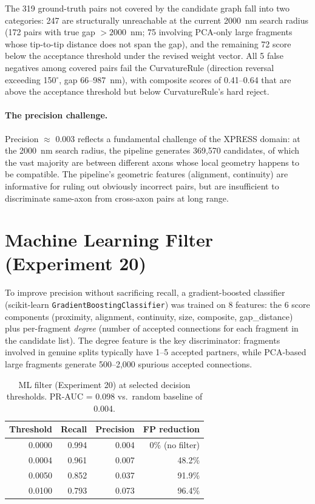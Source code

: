 The 319 ground-truth pairs not covered by the candidate graph fall into two categories:
247 are structurally unreachable at the current 2000~nm search radius (172 pairs
with true gap $> 2000$~nm; 75 involving PCA-only large fragments whose tip-to-tip
distance does not span the gap), and the remaining 72 score below the acceptance
threshold under the revised weight vector. All 5 false negatives among covered
pairs fail the CurvatureRule (direction reversal exceeding 150$^\circ$, gap
66--987~nm), with composite scores of 0.41--0.64 that are above the acceptance
threshold but below CurvatureRule's hard reject.

\paragraph{The precision challenge.}
Precision $\approx$ 0.003 reflects a fundamental challenge of the XPRESS
domain: at the 2000~nm search radius, the pipeline generates 369{,}570
candidates, of which the vast majority are between different axons whose
local geometry
happens to be compatible. The pipeline's geometric features (alignment, continuity)
are informative for ruling out obviously incorrect pairs, but are insufficient
to discriminate same-axon from cross-axon pairs at long range.

\section{Machine Learning Filter (Experiment 20)}

To improve precision without sacrificing recall, a gradient-boosted classifier
(scikit-learn \texttt{GradientBoostingClassifier}) was trained on 8 features:
the 6 score components (proximity, alignment, continuity, size, composite,
gap\_distance) plus per-fragment \emph{degree} (number of accepted connections
for each fragment in the candidate list). The degree feature is the key
discriminator: fragments involved in genuine splits typically have 1--5 accepted
partners, while PCA-based large fragments generate 500--2{,}000 spurious accepted
connections.

\begin{table}[H]
\centering
\caption{ML filter (Experiment 20) at selected decision thresholds. PR-AUC = 0.098
vs.\ random baseline of 0.004.}
\label{tab:ml_filter}
\begin{tabular}{@{}rrrr@{}}
\toprule
Threshold & Recall & Precision & FP reduction \\
\midrule
0.0000 & 0.994 & 0.004 & 0\% (no filter) \\
0.0004 & 0.961 & 0.007 & 48.2\% \\
0.0050 & 0.852 & 0.037 & 91.9\% \\
0.0100 & 0.793 & 0.073 & 96.4\% \\
\bottomrule
\end{tabular}
\end{table}

